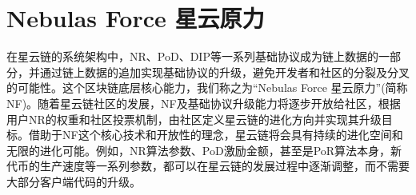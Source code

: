 \section{Nebulas Force 星云原力}
\label{sec:nebulasforce}

在星云链的系统架构中，NR、PoD、DIP等一系列基础协议成为链上数据的一部分，并通过链上数据的追加实现基础协议的升级，避免开发者和社区的分裂及分叉的可能性。这个区块链底层核心能力，我们称之为“Nebulas Force 星云原力”(简称NF)。随着星云链社区的发展，NF及基础协议升级能力将逐步开放给社区，根据用户NR的权重和社区投票机制，由社区定义星云链的进化方向并实现其升级目标。借助于NF这个核心技术和开放性的理念，星云链将会具有持续的进化空间和无限的进化可能。例如，NR算法参数、PoD激励金额，甚至是PoR算法本身，新代币的生产速度等一系列参数，都可以在星云链的发展过程中逐渐调整，而不需要大部分客户端代码的升级。


